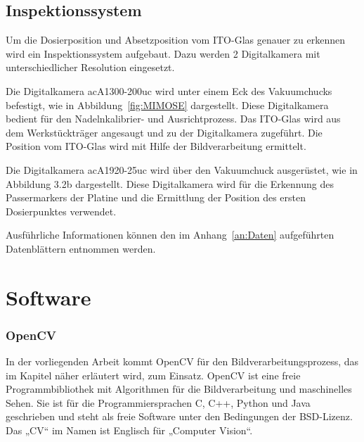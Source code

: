 \subsection{Inspektionssystem}
Um die Dosierposition und Absetzposition vom ITO-Glas genauer zu erkennen wird ein Inspektionssystem aufgebaut. Dazu werden 2 Digitalkamera mit unterschiedlicher Resolution eingesetzt. 

Die Digitalkamera acA1300-200uc wird unter einem Eck des Vakuumchucks befestigt, wie in Abbildung~\ref{fig:MIMOSE} dargestellt. Diese Digitalkamera bedient für den Nadelnkalibrier- und Ausrichtprozess. Das ITO-Glas wird aus dem Werkstückträger angesaugt und zu der Digitalkamera zugeführt. Die Position vom ITO-Glas wird mit Hilfe der Bildverarbeitung ermittelt.

Die Digitalkamera acA1920-25uc wird über den Vakuumchuck ausgerüstet, wie in Abbildung 3.2b dargestellt.  Diese Digitalkamera wird für die Erkennung des Passermarkers der Platine und die Ermittlung der Position des ersten Dosierpunktes verwendet.

Ausführliche Informationen können den im Anhang~\ref{an:Daten} aufgeführten Datenblättern entnommen werden.


\section{Software}
\label{sec:Software}

\subsubsection{OpenCV}

In der vorliegenden Arbeit kommt OpenCV für den Bildverarbeitungsprozess, das im Kapitel näher erläutert wird, zum Einsatz. OpenCV ist eine freie Programmbibliothek mit Algorithmen für die Bildverarbeitung und maschinelles Sehen. Sie ist für die Programmiersprachen C, C++, Python und Java geschrieben und steht als freie Software unter den Bedingungen der BSD-Lizenz. Das „CV“ im Namen ist Englisch für „Computer Vision“.  

